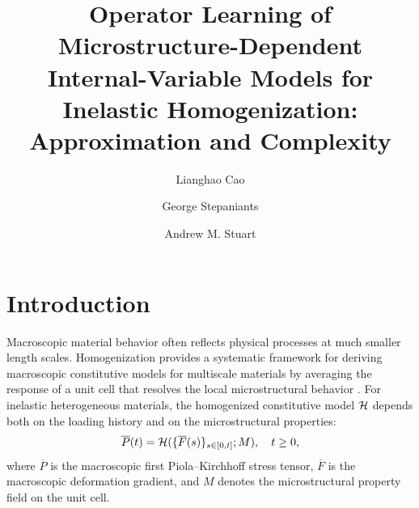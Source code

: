 \documentclass[3p, 12pt, preprint]{elsarticle}
\begin{document}
\begin{frontmatter}
\title{Operator Learning of Microstructure-Dependent Internal-Variable Models for Inelastic Homogenization:\\ Approximation and Complexity}

\author{Lianghao Cao
}

\author{George Stepaniants
}

\author{Andrew M. Stuart
}





\begin{abstract}
    
\end{abstract}
\end{frontmatter}

\linenumbers

\section{Introduction}

Macroscopic material behavior often reflects physical processes at much smaller length scales. Homogenization provides a systematic framework for deriving macroscopic constitutive models for multiscale materials by averaging the response of a unit cell that resolves the local microstructural behavior \cite{bensoussan1978asymptotic,sanchezpalencia1980nonhomogeneous,allaire1992homogenization,jikov1994homogenization, pavliotis2008multiscale}. For inelastic heterogeneous materials, the homogenized constitutive model ${\mathcal{H}}$ depends both on the loading history and on the microstructural properties:
\begin{equation} \label{eq:one}
    \overline{P}(t) = {\mathcal{H}}(\{\overline{F}(s)\}_{s\in[0,t]}; M),\quad t\geq 0,
\end{equation}
where $\overline{P}$ is the macroscopic first Piola--Kirchhoff stress tensor, $\overline{F}$ is the macroscopic deformation gradient, and $M$ denotes the microstructural property field on the unit cell. 
\end{document}
